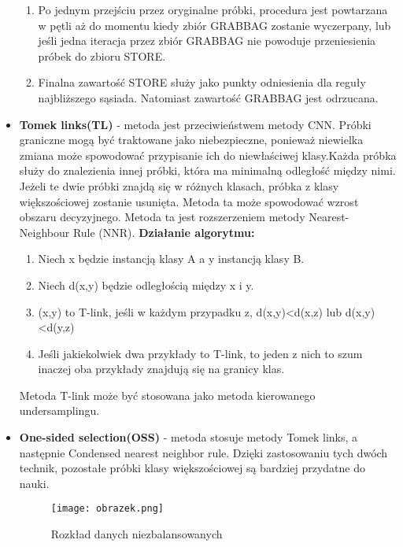 \documentclass{article}
\begin{document}
\begin{itemize}
\begin{enumerate}
        \item Po jednym przejściu przez oryginalne próbki, procedura jest powtarzana w pętli aż do momentu kiedy zbiór GRABBAG zostanie wyczerpany, lub  jeśli jedna iteracja przez zbiór GRABBAG nie powoduje przeniesienia próbek do zbioru STORE.
    
        \item Finalna zawartość STORE służy jako punkty odniesienia dla reguły najbliższego sąsiada. Natomiast zawartość GRABBAG jest odrzucana.
        
    \end{enumerate}
    
    \newline
    \item \textbf{Tomek links(TL)} - metoda jest przeciwieństwem metody CNN. Próbki graniczne mogą być traktowane jako niebezpieczne, ponieważ niewielka zmiana może spowodować przypisanie ich do niewłaściwej klasy.Każda próbka służy do znalezienia innej próbki, która ma minimalną odległość między nimi. Jeżeli te dwie próbki znajdą się w różnych klasach, próbka z klasy większościowej zostanie usunięta. Metoda ta może spowodować wzrost obszaru decyzyjnego. Metoda ta jest rozszerzeniem metody Nearest-Neighbour Rule (NNR). 
    \newline
    \textbf{Działanie algorytmu:}
    \begin{enumerate}
        \item Niech x będzie instancją klasy A a y instancją klasy B.
        \item Niech d(x,y) będzie odległością między x i y.
        \item(x,y) to T-link, jeśli w każdym przypadku z, d(x,y)<d(x,z) lub d(x,y)<d(y,z)
        \item Jeśli jakiekolwiek dwa przykłady to T-link, to jeden z nich to szum inaczej oba przykłady znajdują się na granicy klas.
    \end{enumerate}

    Metoda T-link może być stosowana jako metoda kierowanego undersamplingu.
    \break
    \item \textbf{One-sided selection(OSS)} - metoda stosuje metody Tomek links, a następnie Condensed nearest neighbor rule. Dzięki zastosowaniu tych dwóch technik, pozostałe próbki klasy większościowej są bardziej przydatne do nauki.
    
    \begin{figure}[h!]
\texttt{[image: obrazek.png]}
\caption{Rozkład danych niezbalansowanych} 
\label{fig:obrazek}
\end{figure}
    

\end{itemize}
\end{document}
